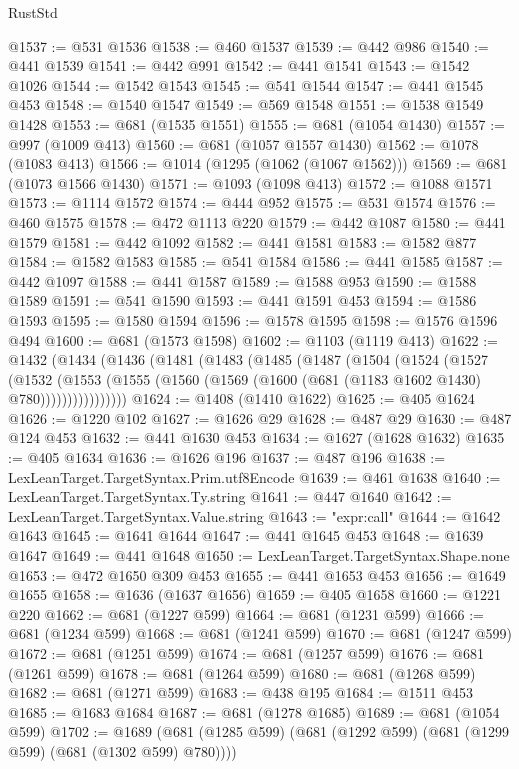 \begin{lexlean}{RustStd}
\begin{coremodule}
{\begin{coremodule}
{{{{{{{{{{{{{{{{{{{{{{{{{{@1537 := @531 @1536
@1538 := @460 @1537
@1539 := @442 @986
@1540 := @441 @1539
@1541 := @442 @991
@1542 := @441 @1541
@1543 := @1542 @1026
@1544 := @1542 @1543
@1545 := @541 @1544
@1547 := @441 @1545 @453
@1548 := @1540 @1547
@1549 := @569 @1548
@1551 := @1538 @1549 @1428
@1553 := @681 (@1535 @1551)
@1555 := @681 (@1054 @1430)
@1557 := @997 (@1009 @413)
@1560 := @681 (@1057 @1557 @1430)
@1562 := @1078 (@1083 @413)
@1566 := @1014 (@1295 (@1062 (@1067 @1562)))
@1569 := @681 (@1073 @1566 @1430)
@1571 := @1093 (@1098 @413)
@1572 := @1088 @1571
@1573 := @1114 @1572
@1574 := @444 @952
@1575 := @531 @1574
@1576 := @460 @1575
@1578 := @472 @1113 @220
@1579 := @442 @1087
@1580 := @441 @1579
@1581 := @442 @1092
@1582 := @441 @1581
@1583 := @1582 @877
@1584 := @1582 @1583
@1585 := @541 @1584
@1586 := @441 @1585
@1587 := @442 @1097
@1588 := @441 @1587
@1589 := @1588 @953
@1590 := @1588 @1589
@1591 := @541 @1590
@1593 := @441 @1591 @453
@1594 := @1586 @1593
@1595 := @1580 @1594
@1596 := @1578 @1595
@1598 := @1576 @1596 @494
@1600 := @681 (@1573 @1598)
@1602 := @1103 (@1119 @413)
@1622 := @1432
    (@1434
      (@1436
        (@1481
          (@1483
            (@1485
              (@1487
                (@1504
                  (@1524
                    (@1527
                      (@1532
                        (@1553
                          (@1555 (@1560 (@1569 (@1600 (@681 (@1183 @1602 @1430) @780))))))))))))))))
@1624 := @1408 (@1410 @1622)
@1625 := @405 @1624
@1626 := @1220 @102
@1627 := @1626 @29
@1628 := @487 @29
@1630 := @487 @124 @453
@1632 := @441 @1630 @453
@1634 := @1627 (@1628 @1632)
@1635 := @405 @1634
@1636 := @1626 @196
@1637 := @487 @196
@1638 := LexLeanTarget.TargetSyntax.Prim.utf8Encode
@1639 := @461 @1638
@1640 := LexLeanTarget.TargetSyntax.Ty.string
@1641 := @447 @1640
@1642 := LexLeanTarget.TargetSyntax.Value.string
@1643 := "expr:call"
@1644 := @1642 @1643
@1645 := @1641 @1644
@1647 := @441 @1645 @453
@1648 := @1639 @1647
@1649 := @441 @1648
@1650 := LexLeanTarget.TargetSyntax.Shape.none
@1653 := @472 @1650 @309 @453
@1655 := @441 @1653 @453
@1656 := @1649 @1655
@1658 := @1636 (@1637 @1656)
@1659 := @405 @1658
@1660 := @1221 @220
@1662 := @681 (@1227 @599)
@1664 := @681 (@1231 @599)
@1666 := @681 (@1234 @599)
@1668 := @681 (@1241 @599)
@1670 := @681 (@1247 @599)
@1672 := @681 (@1251 @599)
@1674 := @681 (@1257 @599)
@1676 := @681 (@1261 @599)
@1678 := @681 (@1264 @599)
@1680 := @681 (@1268 @599)
@1682 := @681 (@1271 @599)
@1683 := @438 @195
@1684 := @1511 @453
@1685 := @1683 @1684
@1687 := @681 (@1278 @1685)
@1689 := @681 (@1054 @599)
@1702 := @1689 (@681 (@1285 @599) (@681 (@1292 @599) (@681 (@1299 @599) (@681 (@1302 @599) @780))))
}}}}}}}}}}}}}}}}}}}}}}}}}}
\end{coremodule}}
\end{coremodule}
\end{lexlean}
